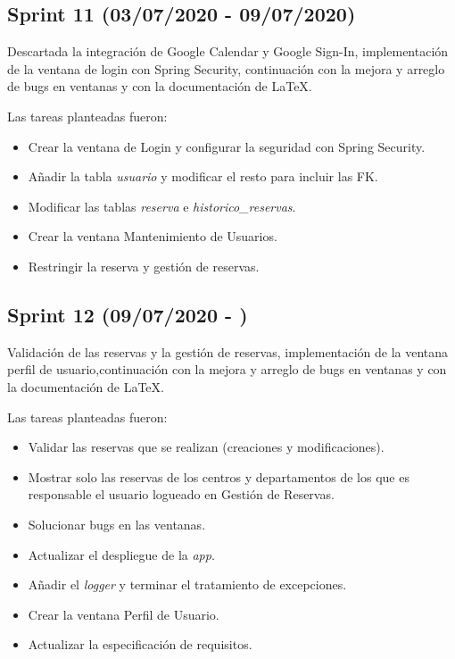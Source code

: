 \subsection{Sprint 11 (03/07/2020 - 09/07/2020)}
Descartada la integración de Google Calendar y Google Sign-In, implementación de la ventana de login con Spring Security, continuación con la mejora y arreglo de bugs en ventanas y con la documentación de \LaTeX.

Las tareas planteadas fueron:
\begin{itemize}
\tightlist
    \item Crear la ventana de Login y configurar la seguridad con Spring Security.
    \item Añadir la tabla \textit{usuario} y modificar el resto para incluir las FK.
    \item Modificar las tablas \textit{reserva} e \textit{historico\_reservas}.
    \item Crear la ventana Mantenimiento de Usuarios.
    \item Restringir la reserva y gestión de reservas.
\end{itemize}

\subsection{Sprint 12 (09/07/2020 - )}
Validación de las reservas y la gestión de reservas, implementación de la ventana perfil de usuario,continuación con la mejora y arreglo de bugs en ventanas y con la documentación de \LaTeX.

Las tareas planteadas fueron:
\begin{itemize}
\tightlist
    \item Validar las reservas que se realizan (creaciones y modificaciones).
    \item Mostrar solo las reservas de los centros y departamentos de los que es responsable el usuario logueado en Gestión de Reservas.
    \item Solucionar bugs en las ventanas.
    \item Actualizar el despliegue de la \textit{app}.
    \item Añadir el \textit{logger} y terminar el tratamiento de excepciones.
    \item Crear la ventana Perfil de Usuario.
    \item Actualizar la especificación de requisitos.
\end{itemize}

